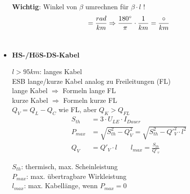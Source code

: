 \begin{itemize}
    \textbf{Wichtig}: Winkel von $\beta$ umrechnen für $\beta \cdot l$ !\\
    \begin{equation*}
    [\beta] = \frac{rad}{km} \Rightarrow \frac{180\degree}{\pi} \cdot \frac{1}{km} = \frac{\circ}{km}\\
    \end{equation*}\\
\item[] \textbf{HS-/HöS-DS-Kabel}

    $l>95km$: langes Kabel\\
    ESB lange/kurze Kabel analog zu Freileitungen (FL)\\
    lange Kabel $\Rightarrow$ Formeln lange FL\\
    kurze Kabel $\Rightarrow$ Formeln kurze FL\\
    $Q_V = Q_L - Q_C$ wie FL, aber $Q_K > Q_{FL}$
    \begin{align*}
        S_{th}&= 3\cdot U_{LE}\cdot I_{Dauer}\\
        P_{max}&= \sqrt{S^2_{th}-Q^2_V} = \sqrt{S^2_{th} - Q'^2_V \cdot l^2}\\
        Q_V &= Q'_V \cdot l \qquad l_{max}= \frac{S_{th}}{Q'_v}
    \end{align*}

    $S_{th}$: thermisch, max. Scheinleistung\\
    $P_{max}$: max. übertragbare Wirkleistung\\
    $l_{max}$: max. Kabellänge, wenn $P_{max} = 0$

\end{itemize}
